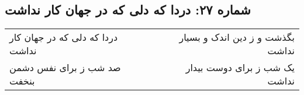 \begin{center}
\section*{شماره ۲۷: دردا که دلی که در جهان کار نداشت}
\label{sec:027}
\begin{longtable}{l p{0.5cm} r}
دردا که دلی که در جهان کار نداشت
&&
بگذشت و ز دین اندک و بسیار نداشت
\\
صد شب ز برای نفس دشمن بنخفت
&&
یک شب ز برای دوست بیدار نداشت
\\
\end{longtable}
\end{center}
